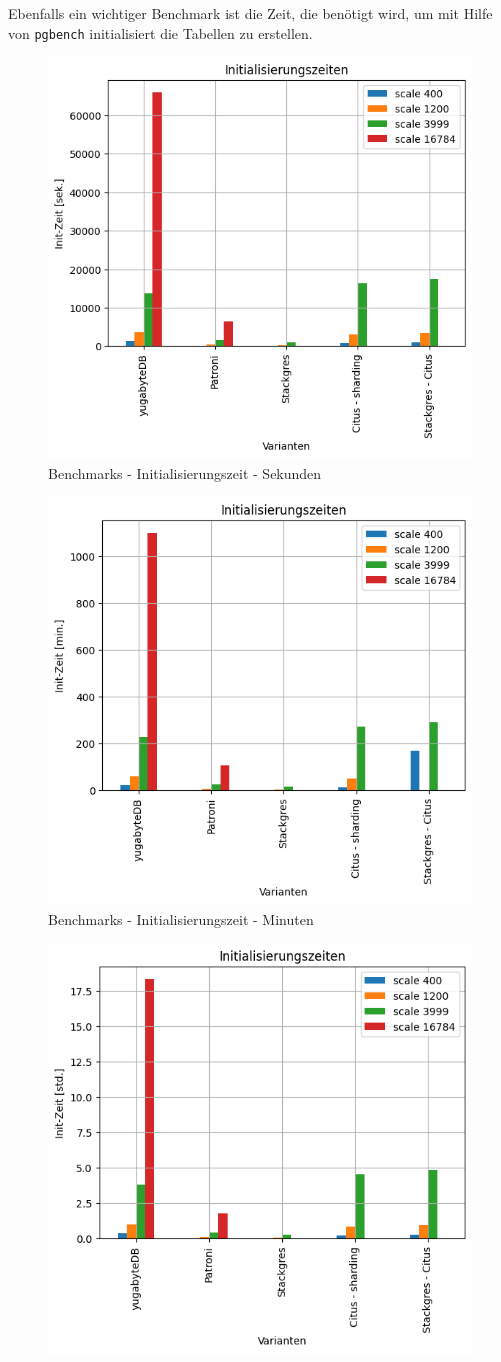 \begin{flushleft}
    Ebenfalls ein wichtiger Benchmark ist die Zeit, die benötigt wird, um mit Hilfe von \texttt{pgbench} initialisiert die Tabellen zu erstellen.
    \begin{figure}[H]
        \centering
        \includegraphics[width=0.5\linewidth]{source/pandas_data_chart_plotter/initializing_time_sec}
        \caption{Benchmarks - Initialisierungszeit - Sekunden}
        \label{fig:initializing_time_sec}
    \end{figure}
    \begin{figure}[H]
        \centering
        \includegraphics[width=0.5\linewidth]{source/pandas_data_chart_plotter/initializing_time_min}
        \caption{Benchmarks - Initialisierungszeit - Minuten}
        \label{fig:initializing_time_min}
    \end{figure}
    \begin{figure}[H]
        \centering
        \includegraphics[width=0.5\linewidth]{source/pandas_data_chart_plotter/initializing_time_hour}

\end{figure}
\end{flushleft}
